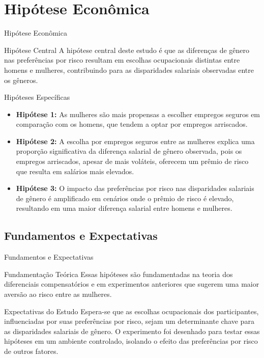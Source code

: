 \documentclass[aspectratio=169, xcolor={dvipsnames}, 10pt, brazil]{beamer}
\begin{document}
\section{Hipótese Econômica}
\begin{frame}{Hipótese Econômica}

    \begin{block}{Hipótese Central}
        A hipótese central deste estudo é que as diferenças de gênero nas preferências por risco resultam em escolhas ocupacionais distintas entre homens e mulheres, contribuindo para as disparidades salariais observadas entre os gêneros.
    \end{block}

    \begin{block}{Hipóteses Específicas}
        \begin{itemize}
            \item \textbf{Hipótese 1:} As mulheres são mais propensas a escolher empregos seguros em comparação com os homens, que tendem a optar por empregos arriscados.
            \item \textbf{Hipótese 2:} A escolha por empregos seguros entre as mulheres explica uma proporção significativa da diferença salarial de gênero observada, pois os empregos arriscados, apesar de mais voláteis, oferecem um prêmio de risco que resulta em salários mais elevados.
            \item \textbf{Hipótese 3:} O impacto das preferências por risco nas disparidades salariais de gênero é amplificado em cenários onde o prêmio de risco é elevado, resultando em uma maior diferença salarial entre homens e mulheres.
        \end{itemize}
    \end{block}

\end{frame}

\subsection{Fundamentos e Expectativas}
\begin{frame}{Fundamentos e Expectativas}

    \begin{block}{Fundamentação Teórica}
        Essas hipóteses são fundamentadas na teoria dos diferenciais compensatórios e em experimentos anteriores que sugerem uma maior aversão ao risco entre as mulheres.
    \end{block}
    
    \begin{block}{Expectativas do Estudo}
        Espera-se que as escolhas ocupacionais dos participantes, influenciadas por suas preferências por risco, sejam um determinante chave para as disparidades salariais de gênero. O experimento foi desenhado para testar essas hipóteses em um ambiente controlado, isolando o efeito das preferências por risco de outros fatores.
    \end{block}

\end{frame}
\end{document}
